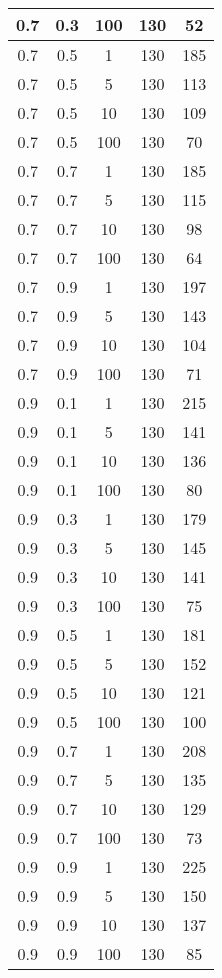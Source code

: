 \begin{appendices}
\begin{longtable}{|c|c|c|c|c|}
		0.7   & 0.3    & 100  & 130   & 52    \\ \hline
		0.7   & 0.5    & 1    & 130   & 185   \\ \hline
		0.7   & 0.5    & 5    & 130   & 113   \\ \hline
		0.7   & 0.5    & 10   & 130   & 109   \\ \hline
		0.7   & 0.5    & 100  & 130   & 70    \\ \hline
		0.7   & 0.7    & 1    & 130   & 185   \\ \hline
		0.7   & 0.7    & 5    & 130   & 115   \\ \hline
		0.7   & 0.7    & 10   & 130   & 98    \\ \hline
		0.7   & 0.7    & 100  & 130   & 64    \\ \hline
		0.7   & 0.9    & 1    & 130   & 197   \\ \hline
		0.7   & 0.9    & 5    & 130   & 143   \\ \hline
		0.7   & 0.9    & 10   & 130   & 104   \\ \hline
		0.7   & 0.9    & 100  & 130   & 71    \\ \hline
		0.9   & 0.1    & 1    & 130   & 215   \\ \hline
		0.9   & 0.1    & 5    & 130   & 141   \\ \hline
		0.9   & 0.1    & 10   & 130   & 136   \\ \hline
		0.9   & 0.1    & 100  & 130   & 80    \\ \hline
		0.9   & 0.3    & 1    & 130   & 179   \\ \hline
		0.9   & 0.3    & 5    & 130   & 145   \\ \hline
		0.9   & 0.3    & 10   & 130   & 141   \\ \hline
		0.9   & 0.3    & 100  & 130   & 75    \\ \hline
		0.9   & 0.5    & 1    & 130   & 181   \\ \hline
		0.9   & 0.5    & 5    & 130   & 152   \\ \hline
		0.9   & 0.5    & 10   & 130   & 121   \\ \hline
		0.9   & 0.5    & 100  & 130   & 100   \\ \hline
		0.9   & 0.7    & 1    & 130   & 208   \\ \hline
		0.9   & 0.7    & 5    & 130   & 135   \\ \hline
		0.9   & 0.7    & 10   & 130   & 129   \\ \hline
		0.9   & 0.7    & 100  & 130   & 73    \\ \hline
		0.9   & 0.9    & 1    & 130   & 225   \\ \hline
		0.9   & 0.9    & 5    & 130   & 150   \\ \hline
		0.9   & 0.9    & 10   & 130   & 137   \\ \hline
		0.9   & 0.9    & 100  & 130   & 85    \\ \hline
	\end{longtable}
	

\end{appendices}
